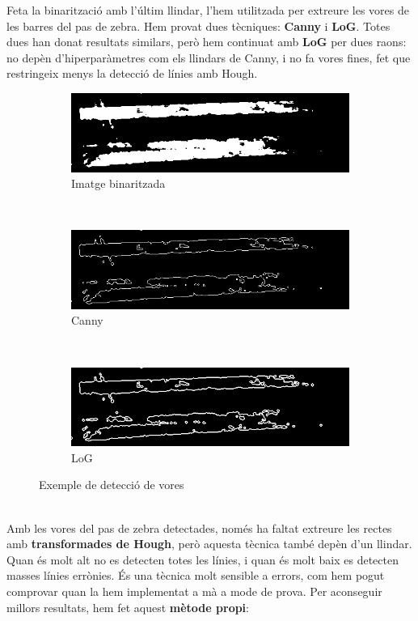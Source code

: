 \documentclass[10pt,a4paper,twocolumn,twoside]{article}
\begin{document}
Feta la binarització amb l’últim llindar, l’hem utilitzada per extreure les vores de les barres del pas de zebra. Hem provat dues tècniques: \textbf{Canny} i \textbf{LoG}. Totes dues han donat resultats similars, però hem continuat amb \textbf{LoG} per dues raons: no depèn d’hiperparàmetres com els llindars de Canny, i no fa vores fines, fet que restringeix menys la detecció de línies amb Hough.
\begin{figure}[!h]
	\centering
	\begin{subfigure}{0.31\columnwidth}
		\includegraphics[width=\linewidth]{figs/mog}
		\caption{Imatge binaritzada}
	\end{subfigure}
	\ 
	\begin{subfigure}{0.31\columnwidth}
		\includegraphics[width=\linewidth]{figs/canny}
		\caption{Canny}
	\end{subfigure}
	\ 
	\begin{subfigure}{0.31\columnwidth}
		\includegraphics[width=\linewidth]{figs/log}
		\caption{LoG}
	\end{subfigure}
	\caption{Exemple de detecció de vores}
	\label{fig:hough}
\end{figure}
\\
Amb les vores del pas de zebra detectades, només ha faltat extreure les rectes amb \textbf{transformades de Hough}, però aquesta tècnica també depèn d'un llindar. Quan és molt alt no es detecten totes les línies, i quan és molt baix es detecten masses línies errònies. És una tècnica molt sensible a errors, com hem pogut comprovar quan la hem implementat a mà a mode de prova. Per aconseguir millors resultats, hem fet aquest \textbf{mètode propi}:
\end{document}
